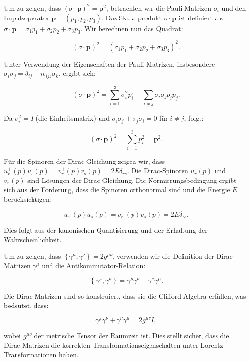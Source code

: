 Um zu zeigen, dass $(\sigma \cdot \mathbf{p})^2 = \mathbf{p}^2$, betrachten wir die Pauli-Matrizen $\sigma_i$ und den Impulsoperator $\mathbf{p} = (p_1, p_2, p_3)$. Das Skalarprodukt $\sigma \cdot \mathbf{p}$ ist definiert als $\sigma \cdot \mathbf{p} = \sigma_1 p_1 + \sigma_2 p_2 + \sigma_3 p_3$. Wir berechnen nun das Quadrat:

\[
(\sigma \cdot \mathbf{p})^2 = (\sigma_1 p_1 + \sigma_2 p_2 + \sigma_3 p_3)^2.
\]

Unter Verwendung der Eigenschaften der Pauli-Matrizen, insbesondere $\sigma_i \sigma_j = \delta_{ij} + i \epsilon_{ijk} \sigma_k$, ergibt sich:

\[
(\sigma \cdot \mathbf{p})^2 = \sum_{i=1}^{3} \sigma_i^2 p_i^2 + \sum_{i \neq j} \sigma_i \sigma_j p_i p_j.
\]

Da $\sigma_i^2 = I$ (die Einheitsmatrix) und $\sigma_i \sigma_j + \sigma_j \sigma_i = 0$ für $i \neq j$, folgt:

\[
(\sigma \cdot \mathbf{p})^2 = \sum_{i=1}^{3} p_i^2 = \mathbf{p}^2.
\]

Für die Spinoren der Dirac-Gleichung zeigen wir, dass $u_r^{+}(p) u_s(p) = v_r^{+}(p) v_s(p) = 2 E \delta_{rs}$. Die Dirac-Spinoren $u_r(p)$ und $v_r(p)$ sind Lösungen der Dirac-Gleichung. Die Normierungsbedingung ergibt sich aus der Forderung, dass die Spinoren orthonormal sind und die Energie $E$ berücksichtigen:

\[
u_r^{+}(p) u_s(p) = v_r^{+}(p) v_s(p) = 2 E \delta_{rs}.
\]

Dies folgt aus der kanonischen Quantisierung und der Erhaltung der Wahrscheinlichkeit.

Um zu zeigen, dass $\left\{\gamma^\mu, \gamma^\nu\right\} = 2 g^{\mu \nu}$, verwenden wir die Definition der Dirac-Matrizen $\gamma^\mu$ und die Antikommutator-Relation:

\[
\left\{\gamma^\mu, \gamma^\nu\right\} = \gamma^\mu \gamma^\nu + \gamma^\nu \gamma^\mu.
\]

Die Dirac-Matrizen sind so konstruiert, dass sie die Clifford-Algebra erfüllen, was bedeutet, dass:

\[
\gamma^\mu \gamma^\nu + \gamma^\nu \gamma^\mu = 2 g^{\mu \nu} I,
\]

wobei $g^{\mu \nu}$ der metrische Tensor der Raumzeit ist. Dies stellt sicher, dass die Dirac-Matrizen die korrekten Transformationseigenschaften unter Lorentz-Transformationen haben.